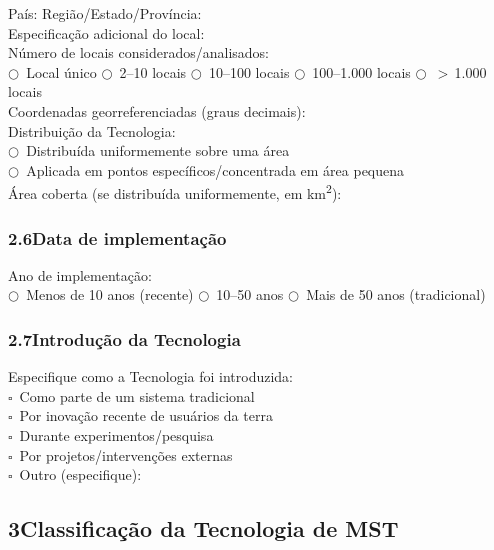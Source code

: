 País: \dotfill\quad Região/Estado/Província: \dotfill\\
Especificação adicional do local: \dotfill\\[4pt]
Número de locais considerados/analisados:\\
$\bigcirc$~Local único \quad $\bigcirc$~2--10 locais \quad $\bigcirc$~10--100 locais \quad $\bigcirc$~100--1.000 locais \quad $\bigcirc$~$>$\,1.000 locais\\[4pt]
Coordenadas georreferenciadas (graus decimais): \dotfill\\[4pt]
Distribuição da Tecnologia:\\
$\bigcirc$~Distribuída uniformemente sobre uma área\\
$\bigcirc$~Aplicada em pontos específicos/concentrada em área pequena\\
Área coberta (se distribuída uniformemente, em km\textsuperscript{2}): \dotfill

\subsubsection*{2.6\quad Data de implementação}

Ano de implementação: \dotfill\\
$\bigcirc$~Menos de 10 anos (recente) \quad $\bigcirc$~10--50 anos \quad $\bigcirc$~Mais de 50 anos (tradicional)

\subsubsection*{2.7\quad Introdução da Tecnologia}

Especifique como a Tecnologia foi introduzida:\\
$\square$~Como parte de um sistema tradicional\\
$\square$~Por inovação recente de usuários da terra\\
$\square$~Durante experimentos/pesquisa\\
$\square$~Por projetos/intervenções externas\\
$\square$~Outro (especifique): \dotfill

\subsection*{3\quad Classificação da Tecnologia de MST}

